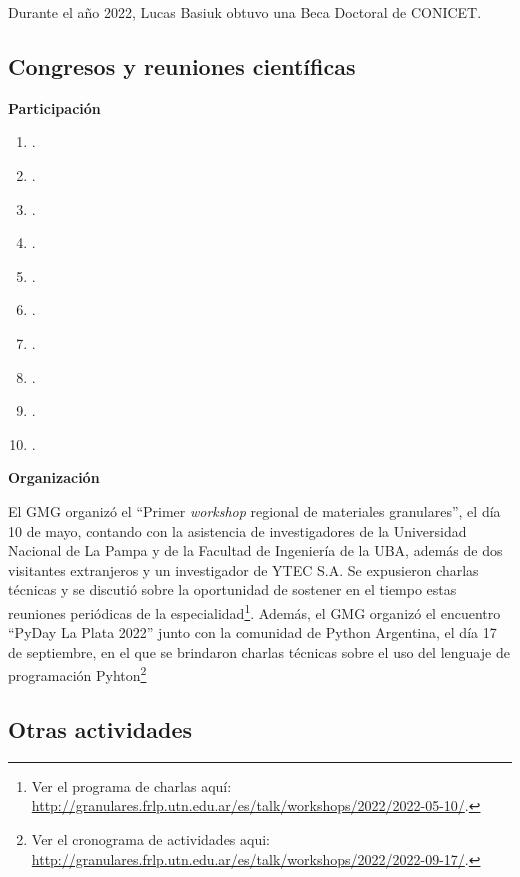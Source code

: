 \documentclass[a4paper,11pt,twoside,final,titlepage,onecolumn,openright]{report}
\begin{document}
Durante el año 2022, Lucas Basiuk obtuvo una Beca Doctoral de CONICET.

\subsection{Congresos y reuniones científicas}

{\bf Participación}

\begin{enumerate}
\item {}.
\item {}.
\item {}.
\item {}.
\item {}.
\item {}.
\item {}.
\item {}.
\item {}.
\item {}.
\end{enumerate}

\vspace{0.25cm}
{\bf Organización}
\vspace{0.5cm}

El GMG organizó el ``Primer \textit{workshop} regional de materiales granulares'', el día 10 de mayo, contando con la asistencia de investigadores de la Universidad Nacional de La Pampa y de la Facultad de Ingeniería de la UBA, además de dos visitantes extranjeros y un investigador de YTEC S.A. Se expusieron charlas técnicas y se discutió sobre la oportunidad de sostener en el tiempo estas reuniones periódicas de la especialidad\footnote{Ver el programa de charlas aquí: \url{http://granulares.frlp.utn.edu.ar/es/talk/workshops/2022/2022-05-10/}.}. Además, el GMG organizó el encuentro ``PyDay La Plata 2022'' junto con la comunidad de Python Argentina, el día 17 de septiembre, en el que se brindaron charlas técnicas sobre el uso del lenguaje de programación Pyhton\footnote{Ver el cronograma de actividades aqui: \url{http://granulares.frlp.utn.edu.ar/es/talk/workshops/2022/2022-09-17/}.}

\subsection{Otras actividades}
\end{document}
